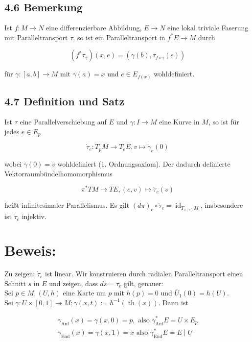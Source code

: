 \documentclass[10pt, letterpaper]{article}
\begin{document}
\subsection*{4.6 Bemerkung}
Ist $f: M \rightarrow N$ eine differenzierbare Abbildung, $E \rightarrow N$ eine lokal triviale Faserung mit Paralleltransport $\tau$, so ist ein Paralleltransport in $f^{*} E \rightarrow M$ durch

$$
\left(f^{*} \tau_{\gamma}\right)(x, e)=\left(\gamma(b), \tau_{f \circ \gamma}(e)\right)
$$

für $\gamma:[a, b] \rightarrow M$ mit $\gamma(a)=x$ und $e \in E_{f(x)}$ wohldefiniert.

\subsection*{4.7 Definition und Satz}
Ist $\tau$ eine Parallelverschiebung auf $E$ und $\gamma: I \rightarrow M$ eine Kurve in $M$, so ist für jedes $e \in E_{p}$

$$
\dot{\tau}_{e}: T_{p} M \rightarrow T_{e} E, v \mapsto \dot{\gamma}_{e}(0)
$$

wobei $\dot{\gamma}(0)=v$ wohldefiniert (1. Ordnungsaxiom). Der dadurch definierte Vektorraumbündelhomomorphismus

$$
\pi^{*} T M \rightarrow T E,(e, v) \mapsto \dot{\tau}_{e}(v)
$$

heißt infinitesimaler Parallelismus. Es gilt $(d \pi)_{e} \circ \dot{\tau}_{e}=\operatorname{id}_{T_{\pi(e)} M}$, insbesondere ist $\dot{\tau}_{e}$ injektiv.

\section*{Beweis:}
Zu zeigen: $\dot{\tau}_{e}$ ist linear. Wir konstruieren durch radialen Paralleltransport einen Schnitt $s$ in $E$ und zeigen, dass $d s=\tau_{e}$ gilt, genauer:\\
Sei $p \in M,(U, h)$ eine Karte um $p$ mit $h(p)=0$ und $\bar{U}_{1}(0)=h(U)$.\\
Sei $\gamma: U \times[0,1] \rightarrow M ; \gamma(x, t):=h^{-1}(\operatorname{th}(x))$. Dann ist

$$
\begin{gathered}
\gamma_{\mathrm{Anf}}(x)=\gamma(x, 0)=p, \text { also } \gamma_{\mathrm{Anf}}^{*} E=U \times E_{p} \\
\gamma_{\mathrm{End}}(x)=\gamma(x, 1)=x \text { also } \gamma_{\mathrm{End}}^{*} E=E \mid U
\end{gathered}
$$
\end{document}
